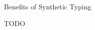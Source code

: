 \begin{frame}{Benefits of Synthetic Typing}
\end{frame}

\begin{frame}{TODO}
\end{frame}



























































































































